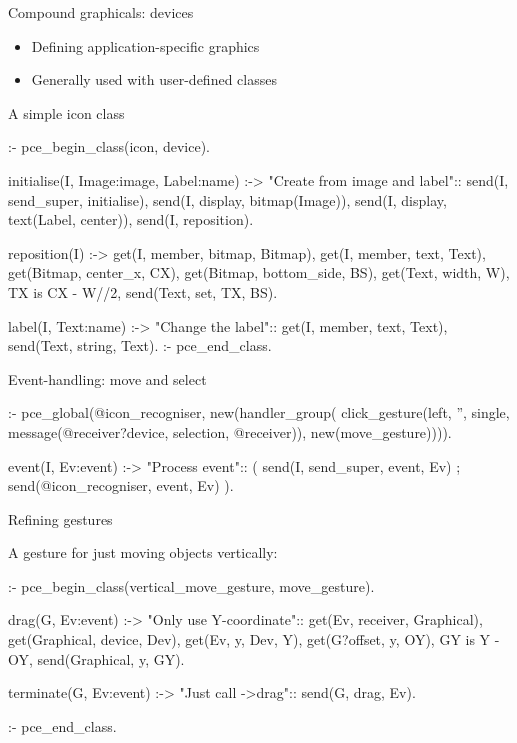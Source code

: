 \begin{sli}{Compound graphicals: devices}
\begin{itemize}
    \item Defining application-specific graphics
    \item Generally used with user-defined classes
\end{itemize}
\end{sli}


\begin{sli}{A simple icon class}
\begin{code}
:- pce_begin_class(icon, device).

initialise(I, Image:image, Label:name) :->
        "Create from image and label"::
        send(I, send_super, initialise),
        send(I, display, bitmap(Image)),
        send(I, display, text(Label, center)),
        send(I, reposition).

reposition(I) :->
        get(I, member, bitmap, Bitmap),
        get(I, member, text, Text),
        get(Bitmap, center_x, CX),
        get(Bitmap, bottom_side, BS),
        get(Text, width, W),
        TX is CX - W//2,
        send(Text, set, TX, BS).

label(I, Text:name) :->
        "Change the label"::
        get(I, member, text, Text),
        send(Text, string, Text).
:- pce_end_class.
\end{code}

\noindent
\end{sli}


\begin{sli}{Event-handling: move and select}

\begin{code}
:- pce_global(@icon_recogniser,
     new(handler_group(
        click_gesture(left, '', single,
                      message(@receiver?device,
                              selection,
                              @receiver)),
        new(move_gesture)))).

event(I, Ev:event) :->
        "Process event"::
        (   send(I, send_super, event, Ev)
        ;   send(@icon_recogniser, event, Ev)
        ).
\end{code}

\noindent
\end{sli}


\begin{sli}{Refining gestures}

A gesture for just moving objects vertically:

\begin{code}
:- pce_begin_class(vertical_move_gesture,
                   move_gesture).

drag(G, Ev:event) :->
        "Only use Y-coordinate"::
        get(Ev, receiver, Graphical),
        get(Graphical, device, Dev),
        get(Ev, y, Dev, Y),
        get(G?offset, y, OY),
        GY is Y - OY,
        send(Graphical, y, GY).

terminate(G, Ev:event) :->
        "Just call ->drag"::
        send(G, drag, Ev).

:- pce_end_class.
\end{code}

\noindent
\end{sli}

